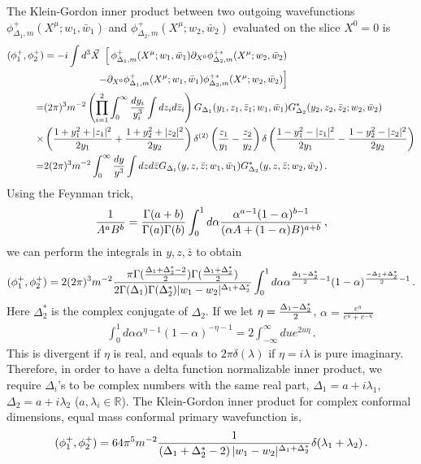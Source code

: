 \documentclass[12pt]{article}
\numberwithin{equation}{section}
\begin{document}
The  Klein-Gordon inner product between two outgoing wavefunctions $\phi^+_{\Delta_1 , m } (X^\mu; w_1,\bar w_1)$ and  $\phi^+_{\Delta_2 , m } (X^\mu; w_2,\bar w_2)$ evaluated on the slice $X^0=0$ is  \begin{align}{\label{eq:ipt}}
( \phi^+_1 , \phi^+_2)&=- i \int d^3 \vec X~\left[\,  
\phi^+_{\Delta_1,m} ( X^\mu; w_1,\bar w_1) \partial_{X^0}\phi_{\Delta_2,m}^{+*} ( X^\mu; w_2,\bar w_2)\right.\notag\\
&\left.
~~~~~~~~~~~~~~~~
-\partial_{X^0}\phi^+_{\Delta_1,m} ( X^\mu; w_1, \bar w_1) \phi_{\Delta_2,m}^{+*} ( X^\mu; w_2,\bar w_2)
\right]
\notag\\
=&(2\pi)^3m^{-2}\left( \prod_{i=1}^2 \int_0^\infty {dy_i \over y_i^3} \int dz_i d\bar z_i\right) G_{\Delta_1}(y_1,z_1,\bar z_1;w_1,\bar w_1) G_{\Delta_2} ^*(y_2 ,z_2,\bar z_2;w_2 ,\bar w_2)\notag\\
\times& \left( {1+y_1^2 +|z_1|^2 \over 2y_1 }+{1+y_2^2 +|z_2|^2 \over 2y_2}\right)
\delta^{(2)}\left( {z_1\over y_1} -{z_2\over y_2}\right)
\delta\left({1-y_1^2 -|z_1|^2 \over 2y_1 }-{1-y_2^2 -|z_2|^2 \over 2y_2 }\right)\notag\\
=&2(2\pi)^3m^{-2} \int_0^\infty   {dy\over y^{3}} \int dzd\bar z
 G_{\Delta_1} (y , z,\bar z;w_1,\bar w_1)G^*_{\Delta_2} (y , z,\bar z ;w_2,\bar w_2)\,.
 \end{align}
  Using the Feynman trick,
\begin{align}
{1\over A^a B^b }  = {\Gamma(a+b) \over \Gamma(a) \Gamma(b) } \int_0^1 d\alpha { \alpha^{a-1} (1-\alpha)^{b-1} \over ( \alpha A + (1-\alpha)B)^{a+b} }\,,
\end{align}
we can perform the integrals in $y,z,\bar z$ to obtain
 \begin{align}
(\phi_1^+,\phi_2^+)=2(2\pi)^3 m^{-2}{\pi \Gamma({\Delta_1+\Delta_2^*-2\over2 })
\Gamma({\Delta_1+\Delta^*_2\over2 }) 
\over 2\Gamma(\Delta_1)\Gamma(\Delta_2^*)  |w_1-w_2|^{\Delta_1+\Delta_2^*}} \int_0^1 d\alpha \alpha^{{\Delta_1-\Delta_2^*\over2}-1 }(1-\alpha)^{{-\Delta_1 +\Delta^*_2\over2}-1} \,.
\end{align}
Here $ \Delta_2^*$ is the complex conjugate of $\Delta_2$. If we let $\eta={\Delta_1-{\Delta}^*_2\over2 }$,  $\alpha=\frac{e^u}{e^u+e^{-u}}$
\begin{align}
\int_0^1 d\alpha \alpha^{\eta-1 }(1-\alpha)^{-\eta-1}=2\int_{-\infty}^{\infty} du e^{2u\eta}\,.
\end{align}
This is divergent if $\eta$ is real, and equals to $2\pi \delta(\lambda)$ if $\eta=i\lambda$ is pure imaginary.
 Therefore, in order to have a  delta function normalizable inner product,  we require $\Delta_i$'s to be complex numbers with the same real part, $\Delta_1=a+i\lambda_1$, $\Delta_2=a+i\lambda_2$ ($a,\lambda_i\in \mathbb{R}$).  The Klein-Gordon inner product for complex conformal dimensions, equal mass conformal primary wavefunction is,
\begin{align}{\label{eq:ipt}}
(\phi_1^+,\phi_2^+)=64\pi^5 m^{-2} {1\over \left( \Delta_1+\Delta_2^*-2\right) |w_1-w_2|^{\Delta_1+\Delta_2^*}} \delta(\lambda_1+\lambda_2)\,.
\end{align}



{}

\end{document}
